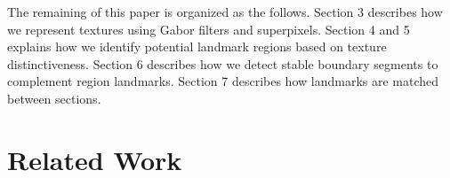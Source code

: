 \documentclass{llncs}
\begin{document}


The remaining of this paper is organized as the follows. Section 3 describes how we represent textures using Gabor filters and superpixels. Section 4 and 5 explains how we identify potential landmark regions based on texture distinctiveness. Section 6 describes how we detect stable boundary segments to complement region landmarks. Section 7 describes how landmarks are matched between sections.



\section{Related Work}

%
\end{document}
